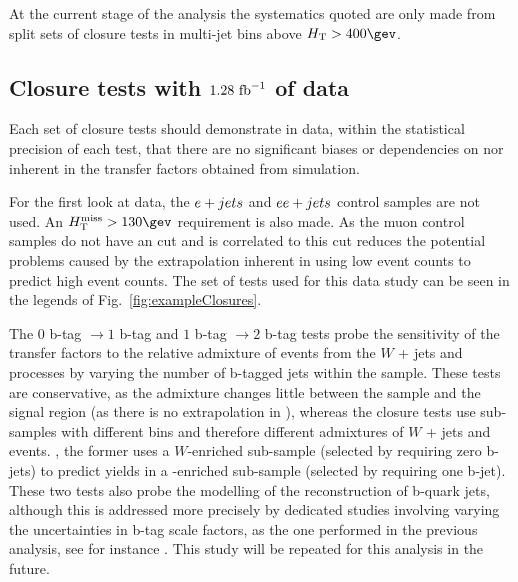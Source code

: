 At the current stage of the analysis the systematics quoted are only
made from split sets of closure tests in multi-jet bins above
$\scalht>400\gev$. 

\subsection{Closure tests with $1.28~\text{fb}^{-1}$ of data}
\label{sec:closure-data-study}

Each set of closure tests should demonstrate in data, within the
statistical precision of each test, that there are no significant
biases or dependencies on \njet nor \scalht inherent in the transfer
factors obtained from simulation. 

For the first look at data, the $e + jets$ and $ee + jets$ control samples are
not used. An $\mht>130\gev$ requirement is also made. As the muon
control samples do not have an \alphat cut and \mht is correlated to
\alphat this cut reduces the potential problems
caused by the extrapolation inherent in using low \mht event counts to
predict high \mht event counts.
The set of tests used for
this data study can be seen in the legends of
Fig.~\ref{fig:exampleClosures}.

The $0$ b-tag $\rightarrow1$ b-tag and $1$ b-tag $\rightarrow2$ b-tag
tests probe the
sensitivity of the transfer factors to the relative admixture of
events from the $W$ + jets and \ttbar processes by varying the number
of b-tagged jets within the \mj sample. These tests are conservative,
as the admixture changes little between the \mj sample and the signal
region (as there is no extrapolation in \nb), whereas the closure
tests use sub-samples with different \nb bins and therefore different
admixtures of $W$ + jets and \ttbar events. \eg, the former uses a
$W$-enriched sub-sample (selected by requiring zero b-jets) to predict
yields in a \ttbar-enriched sub-sample (selected by requiring one
b-jet).  These two tests also probe the modelling of the
reconstruction of b-quark jets, although this is addressed more
precisely by dedicated studies involving varying the uncertainties in
b-tag scale factors, as the one performed in the previous analysis,
see for instance \cite{CMS_AN_2013-366}. This study will be repeated
for this analysis in the future.

